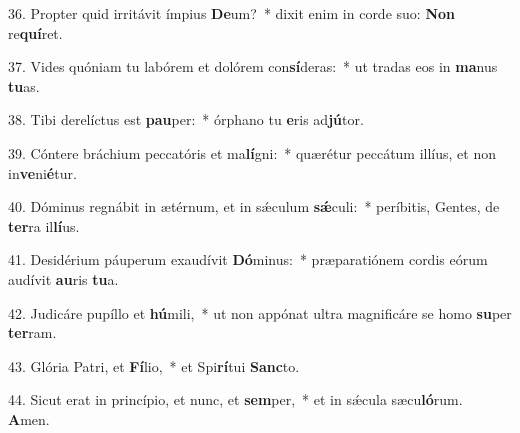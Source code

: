 36. Propter quid irritávit ímpius \textbf{De}um?~*  dixit enim in corde suo: \textbf{Non} re\textbf{quí}ret.\

37. Vides quóniam tu labórem et dolórem con\textbf{sí}deras:~*  ut tradas eos in \textbf{ma}nus \textbf{tu}as.\

38. Tibi derelíctus est \textbf{pau}per:~*  órphano tu \textbf{e}ris ad\textbf{jú}tor.\

39. Cóntere bráchium peccatóris et ma\textbf{lí}gni:~*  quærétur peccátum illíus, et non in\textbf{ve}ni\textbf{é}tur.\

40. Dóminus regnábit in ætérnum, et in sǽculum \textbf{sǽ}culi:~*  períbitis, Gentes, de \textbf{ter}ra il\textbf{lí}us.\

41. Desidérium páuperum exaudívit \textbf{Dó}minus:~*  præparatiónem cordis eórum audívit \textbf{au}ris \textbf{tu}a.\

42. Judicáre pupíllo et \textbf{hú}mili,~*  ut non appónat ultra magnificáre se homo \textbf{su}per \textbf{ter}ram.\

43. Glória Patri, et \textbf{Fí}lio,~*  et Spi\textbf{rí}tui \textbf{Sanc}to.\

44. Sicut erat in princípio, et nunc, et \textbf{sem}per,~*  et in sǽcula sæcu\textbf{ló}rum. \textbf{A}men.\

